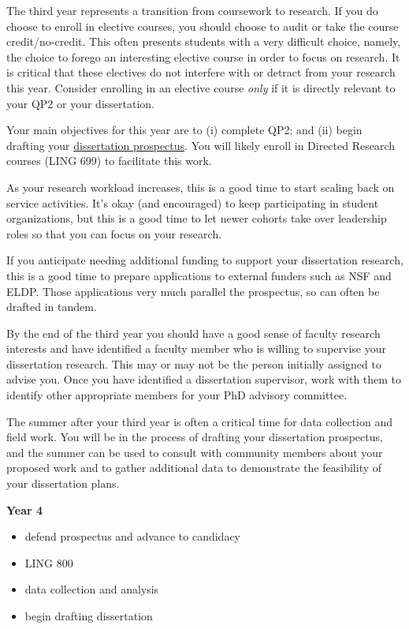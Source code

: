 \documentclass[
]{book}
\providecommand{\tightlist}{%
  \setlength{\itemsep}{0pt}\setlength{\parskip}{0pt}}
\begin{document}
The third year represents a transition from coursework to research. If you do choose to enroll in elective courses, you should choose to audit or take the course credit/no-credit. This often presents students with a very difficult choice, namely, the choice to forego an interesting elective course in order to focus on research. It is critical that these electives do not interfere with or detract from your research this year. Consider enrolling in an elective course \emph{only} if it is directly relevant to your QP2 or your dissertation.

Your main objectives for this year are to (i) complete QP2; and (ii) begin drafting your \hyperref[Dissertationux5cux2520Proposalux5cux2520andux5cux2520Prospectus]{dissertation prospectus}. You will likely enroll in Directed Research courses (LING 699) to facilitate this work.

As your research workload increases, this is a good time to start scaling back on service activities. It's okay (and encouraged) to keep participating in student organizations, but this is a good time to let newer cohorts take over leadership roles so that you can focus on your research.

If you anticipate needing additional funding to support your dissertation research, this is a good time to prepare applications to external funders such as NSF and ELDP. Those applications very much parallel the prospectus, so can often be drafted in tandem.

By the end of the third year you should have a good sense of faculty research interests and have identified a faculty member who is willing to supervise your dissertation research. This may or may not be the person initially assigned to advise you. Once you have identified a dissertation supervisor, work with them to identify other appropriate members for your PhD advisory committee.

The summer after your third year is often a critical time for data collection and field work. You will be in the process of drafting your dissertation prospectus, and the summer can be used to consult with community members about your proposed work and to gather additional data to demonstrate the feasibility of your dissertation plans.

\textbf{Year 4}

\begin{itemize}
\tightlist
\item
  defend prospectus and advance to candidacy
\item
  LING 800
\item
  data collection and analysis
\item
  begin drafting dissertation
\end{itemize}
\end{document}
